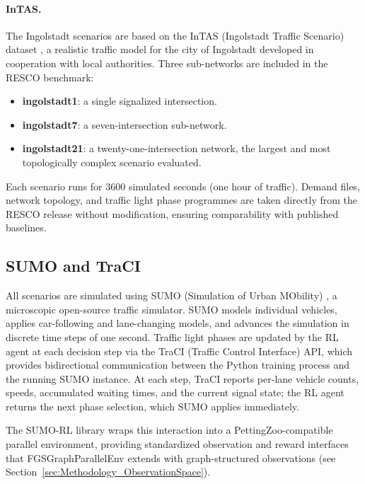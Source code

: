 \paragraph{InTAS.}
The Ingolstadt scenarios are based on the InTAS (Ingolstadt Traffic Scenario) dataset \citep{intasscenario}, a realistic traffic model for the city of Ingolstadt developed in cooperation with local authorities. Three sub-networks are included in the RESCO benchmark:
\begin{itemize}
  \item \textbf{ingolstadt1}: a single signalized intersection.
  \item \textbf{ingolstadt7}: a seven-intersection sub-network.
  \item \textbf{ingolstadt21}: a twenty-one-intersection network, the largest and most topologically complex scenario evaluated.
\end{itemize}

Each scenario runs for 3600 simulated seconds (one hour of traffic). Demand files, network topology, and traffic light phase programmes are taken directly from the RESCO release without modification, ensuring comparability with published baselines.

\subsection{SUMO and TraCI}
\label{sec:ExperimentalDesign_SUMOTraCI}

All scenarios are simulated using SUMO (Simulation of Urban MObility) \citep{lopez2018microscopic}, a microscopic open-source traffic simulator. SUMO models individual vehicles, applies car-following and lane-changing models, and advances the simulation in discrete time steps of one second. Traffic light phases are updated by the RL agent at each decision step via the TraCI (Traffic Control Interface) API, which provides bidirectional communication between the Python training process and the running SUMO instance. At each step, TraCI reports per-lane vehicle counts, speeds, accumulated waiting times, and the current signal state; the RL agent returns the next phase selection, which SUMO applies immediately.

The SUMO-RL library \citep{alegre2021sumorl} wraps this interaction into a PettingZoo-compatible parallel environment, providing standardized observation and reward interfaces that FGSGraphParallelEnv extends with graph-structured observations (see Section~\ref{sec:Methodology_ObservationSpace}).

